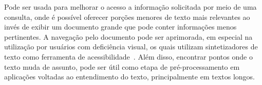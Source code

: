 Pode ser usada para melhorar o acesso a informação solicitada por meio de uma consulta, onde é possível oferecer porções menores de texto mais relevantes ao invés de exibir um documento grande que pode conter informações menos pertinentes. 
%
%
A navegação pelo documento pode ser aprimorada, em especial na utilização por usuários com deficiência visual, os quais utilizam  sintetizadores de texto como ferramenta de acessibilidade~\cite{Choi2000}. 
%
Além disso, encontrar pontos onde o texto muda de assunto, pode ser útil como etapa de pré-processamento em aplicações voltadas ao entendimento do texto, principalmente em textos longos.






 




